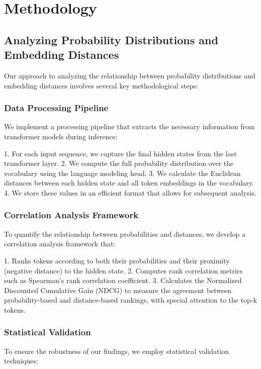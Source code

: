\chapter{Methodology}

\section{Analyzing Probability Distributions and Embedding Distances}

Our approach to analyzing the relationship between probability distributions and embedding distances involves several key methodological steps:

\subsection{Data Processing Pipeline}

We implement a processing pipeline that extracts the necessary information from transformer models during inference:

1. For each input sequence, we capture the final hidden states from the last transformer layer.
2. We compute the full probability distribution over the vocabulary using the language modeling head.
3. We calculate the Euclidean distances between each hidden state and all token embeddings in the vocabulary.
4. We store these values in an efficient format that allows for subsequent analysis.

\subsection{Correlation Analysis Framework}

To quantify the relationship between probabilities and distances, we develop a correlation analysis framework that:

1. Ranks tokens according to both their probabilities and their proximity (negative distance) to the hidden state.
2. Computes rank correlation metrics such as Spearman's rank correlation coefficient.
3. Calculates the Normalized Discounted Cumulative Gain (NDCG) to measure the agreement between probability-based and distance-based rankings, with special attention to the top-k tokens.

\subsection{Statistical Validation}

To ensure the robustness of our findings, we employ statistical validation techniques:

